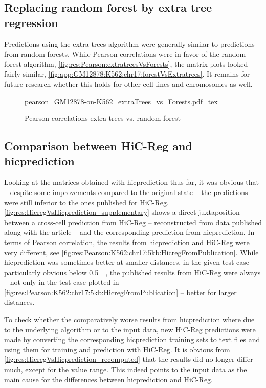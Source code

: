 \subsection{Replacing random forest by extra tree regression} \label{sec:res:extratrees}
Predictions using the extra trees algorithm were generally similar to predictions from random forests.
While Pearson correlations were in favor of the random forest algorithm, \autoref{fig:res:Pearson:extratreesVsForests},
the matrix plots looked fairly similar, \autoref{fig:app:GM12878:K562:chr17:forestVsExtratrees}.
It remains for future research whether this holds for other cell lines and chromosomes as well.
\begin{figure}[hb]
  \centering
  \scriptsize
  {pearson_GM12878-on-K562_extraTrees_vs_Forests.pdf_tex}
  \caption{Pearson correlations extra trees vs. random forest}
  \label{fig:res:Pearson:extratreesVsForests}
\end{figure}

\subsection{Comparison between HiC-Reg and hicprediction} \label{sec:res:compare}
Looking at the matrices obtained with hicprediction thus far, it was obvious that -- despite some improvements compared to the original state -- 
the predictions were still inferior to the ones published for HiC-Reg.
\autoref{fig:res:HicregVsHicprediction_supplementary} shows a direct juxtaposition between a cross-cell prediction from HiC-Reg -- 
reconstructed from data published along with the article \cite{Zhang2019} --
and the corresponding prediction from hicprediction.
In terms of Pearson correlation, the results from hicprediction and HiC-Reg were very different, 
see \autoref{fig:res:Pearson:K562:chr17:5kb:HicregFromPublication}. 
While hicprediction was sometimes better at smaller distances, in the given test case particularly obvious below \SI{0.5}{\mega\bp}, 
the published results from HiC-Reg were always -- not only in the test case plotted in \autoref{fig:res:Pearson:K562:chr17:5kb:HicregFromPublication} -- better 
for larger distances.

To check whether the comparatively worse results from hicprediction where due to the underlying algorithm or to the input data,
new HiC-Reg predictions were made by converting the corresponding hicprediction training sets to text files and using them for
training and prediction with HiC-Reg.
It is obvious from \autoref{fig:res:HicregVsHicprediction_recomputed} that the results did no longer differ much,
except for the value range. This indeed points to the input data as the main cause for the differences between hicprediction and HiC-Reg.

